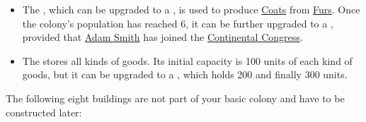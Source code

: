\documentclass[12pt]{article}
\begin{document}
\begin{itemize}
\item The , which can be upgraded to a
  , is used to produce
  \hyperlink{Coats}{Coats} from \hyperlink{Furs}{Furs}. Once the
  colony's population has reached 6, it can be further upgraded to a
  , provided that \hyperlink{Adam Smith}{Adam
  Smith} has joined the \hyperlink{Continental Congress}{Continental
  Congress}.

\item The  stores all kinds of goods. Its initial
  capacity is 100 units of each kind of goods, but it can be upgraded
  to a , which holds 200 and finally 300
  units.
\end{itemize}

The following eight buildings are not part of your basic colony and
have to be constructed later:
\end{document}
